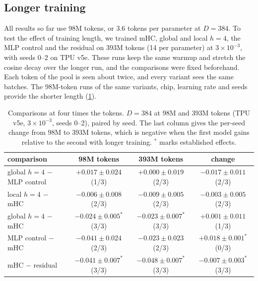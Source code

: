 \documentclass[11pt, a4paper]{article}
\newcommand{\lr}[1]{\ensuremath{#1 \times 10^{-3}}}
\newcommand{\est}{^{\ast}}
\begin{document}
\subsection{Longer training}
\label{sec:long}

All results so far use 98M tokens, or 3.6 tokens per parameter at $D = 384$. To test the effect of training length, we trained mHC,
global and local $h = 4$, the MLP control and the residual on 393M tokens (14 per parameter) at \lr{3}, with seeds 0--2 on TPU v5e.
These runs keep the same warmup and stretch the cosine decay over the longer run, and the comparisons were fixed beforehand. Each
token of the pool is seen about twice, and every variant sees the same batches. The 98M-token runs of the same variants, chip,
learning rate and seeds provide the shorter length (\cref{tab:long}).

\begin{table}[ht]
  \centering
  \caption{Comparisons at four times the tokens. $D = 384$ at 98M and 393M tokens (TPU v5e, \lr{3}, seeds 0--2), paired by seed.
    The last column gives the per-seed change from 98M to 393M tokens, which is negative when the first model gains relative to the
    second with longer training. $\est$ marks established effects.}
  \label{tab:long}
  \small
  \setlength{\tabcolsep}{4pt}
  \begin{tabular}{lccc}
    \toprule
    comparison & 98M tokens & 393M tokens & change \\
    \midrule
    global $h = 4$ $-$ MLP control & $+0.017 \pm 0.024$ (1/3) & $+0.000 \pm 0.019$ (2/3) & $-0.017 \pm 0.011$ (2/3) \\
    local $h = 4$ $-$ mHC & $-0.006 \pm 0.008$ (2/3) & $-0.009 \pm 0.005$ (2/3) & $-0.003 \pm 0.005$ (2/3) \\
    global $h = 4$ $-$ mHC & $-0.024 \pm 0.005\est$ (3/3) & $-0.023 \pm 0.007\est$ (3/3) & $+0.001 \pm 0.011$ (1/3) \\
    MLP control $-$ mHC & $-0.041 \pm 0.024$ (2/3) & $-0.023 \pm 0.023$ (2/3) & $+0.018 \pm 0.001\est$ (0/3) \\
    mHC $-$ residual & $-0.041 \pm 0.007\est$ (3/3) & $-0.048 \pm 0.007\est$ (3/3) & $-0.007 \pm 0.003\est$ (3/3) \\
    \bottomrule
  \end{tabular}
\end{table}
\end{document}
